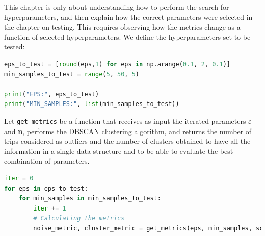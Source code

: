 This chapter is only about understanding how to perform the search for hyperparameters, and then explain how the correct parameters were selected in the chapter on testing.
This requires observing how the metrics change as a function of selected hyperparameters. We define the hyperparameters set to be tested:

\begin{minipage}{\linewidth}
\begin{lstlisting}[language=Python]
eps_to_test = [round(eps,1) for eps in np.arange(0.1, 2, 0.1)]
min_samples_to_test = range(5, 50, 5)

print("EPS:", eps_to_test)
print("MIN_SAMPLES:", list(min_samples_to_test))
\end{lstlisting}
\end{minipage}

Let \verb|get_metrics| be a function that receives as input the iterated parameters $\varepsilon$ and \textbf{n}, performs the DBSCAN clustering algorithm, and returns the number of trips considered as outliers and the number of clusters obtained to have all the information in a single data structure and to be able to evaluate the best combination of parameters.

\begin{minipage}{\linewidth}
\begin{lstlisting}[language=Python]
iter = 0
for eps in eps_to_test:
    for min_samples in min_samples_to_test:
        iter += 1
        # Calculating the metrics
        noise_metric, cluster_metric = get_metrics(eps, min_samples, scaled_df, iter)
\end{lstlisting}
\end{minipage}

